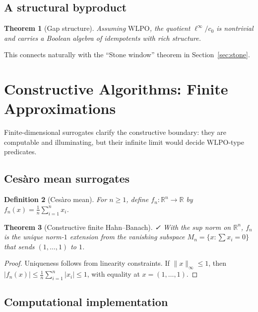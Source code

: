 \documentclass[11pt]{article}  %
\newtheorem{theorem}{Theorem}[section]
\newtheorem{definition}[theorem]{Definition}
\newenvironment{thm}{\begin{theorem}}{\end{theorem}}
\newenvironment{defi}{\begin{definition}}{\end{definition}}
\newtheorem{theorem}{Theorem}[section]
\newtheorem{definition}[theorem]{Definition}
\newenvironment{thm}{\begin{theorem}}{\end{theorem}}
\newenvironment{defi}{\begin{definition}}{\end{definition}}
\newcommand{\leanok}{\textsf{\small \textcolor{green!70!black}{✓}}}
\newcommand{\R}{\mathbb{R}}
\newcommand{\linf}{\ell^\infty}
\newcommand{\cnull}{c_0}
\newcommand{\WLPO}{\mathrm{WLPO}}
\begin{document}
\subsection{A structural byproduct}

\begin{thm}[Gap structure]
Assuming $\WLPO$, the quotient $\linf/\cnull$ is nontrivial and carries a Boolean algebra of idempotents with rich structure.
\end{thm}

This connects naturally with the ``Stone window'' theorem in Section~\ref{sec:stone}.

\section{Constructive Algorithms: Finite Approximations}

Finite-dimensional surrogates clarify the constructive boundary: they are computable and illuminating, but their infinite limit would decide $\WLPO$-type predicates.

\subsection{Ces\`aro mean surrogates}

\begin{defi}[Ces\`aro mean]
For $n\ge 1$, define $f_n:\R^n\to\R$ by $f_n(x)=\frac{1}{n}\sum_{i=1}^n x_i$.
\end{defi}

\begin{thm}[Constructive finite Hahn--Banach]\label{thm:finite-hb}\leanok
With the sup norm on $\R^n$, $f_n$ is the unique norm-$1$ extension from the vanishing subspace $M_n=\{x:\sum x_i=0\}$ that sends $(1,\dots,1)$ to $1$.
\end{thm}

\begin{proof}
Uniqueness follows from linearity constraints. If $\|x\|_\infty\le 1$, then $|f_n(x)|\le \frac{1}{n}\sum_{i=1}^n|x_i|\le 1$, with equality at $x=(1,\dots,1)$.
\end{proof}

\subsection{Computational implementation}
\end{document}
